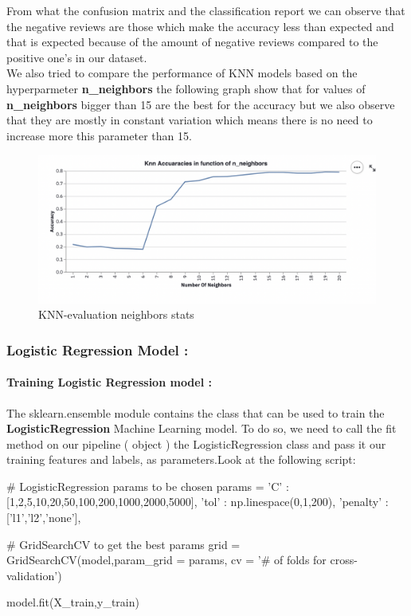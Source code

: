 \documentclass{article}
\begin{document}
From what the confusion matrix and the classification report we can observe that the negative reviews are those which make the accuracy less than expected and that is expected because of the amount of negative reviews compared to the positive one's in our dataset.\\
We also tried to compare the performance of KNN models based on the hyperparmeter \textbf{n\_neighbors} the following graph show that for values of \textbf{n\_neighbors} bigger than 15 are the best for the accuracy but we also observe that they are mostly in constant variation which means there is no need to increase more this parameter than 15.\\
\begin{figure}[H]
    \centering
    \includegraphics[scale=0.4]{src/img/knn_accuracies.png}
    \caption{KNN-evaluation neighbors stats}
    \label{fig:my_label}
\end{figure}
\newpage
\subsubsection{ Logistic Regression Model :}
\paragraph{ Training Logistic Regression model : }
The sklearn.ensemble module contains the  class that can be used to train the \textbf{LogisticRegression} Machine Learning model. To do so, we need to call the fit method on our pipeline  (  object ) the LogisticRegression class and pass it our training features and labels, as parameters.Look at the following script:
\begin{code}
# LogisticRegression params to be chosen
params = {
    'C' : [1,2,5,10,20,50,100,200,1000,2000,5000],
    'tol' : np.linespace(0,1,200),
    'penalty' : ['l1','l2','none'],
}

# GridSearchCV to get the best params
grid = GridSearchCV(model,param_grid = params, cv = '# of folds for cross-validation')

model.fit(X_train,y_train)
\end{code}
\end{document}
